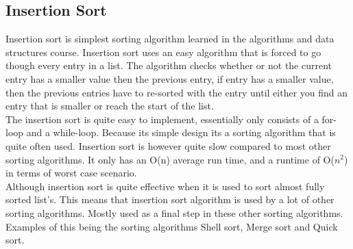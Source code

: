 \subsection{Insertion Sort}
Insertion sort is simplest sorting algorithm learned in the algorithms and data structures course. Insertion sort uses an easy algorithm that is forced to go though every entry in a list. The algorithm checks whether or not the current entry has a smaller value then the previous entry, if entry has a smaller value, then the previous entries have to re-sorted with the entry until either you find an entry that is smaller or reach the start of the list. 
\\[11pt]
The insertion sort is quite easy to implement, essentially only consists of a for-loop and a while-loop. Because its simple design its a sorting algorithm that is quite often used. Insertion sort is however quite slow compared to most other sorting algorithms. It only has an O(n) average run time, and a runtime of O($n^2$) in terms of worst case scenario.
\\[11pt]
Although insertion sort is quite effective when it is used to sort almost fully sorted list's. This means that insertion sort algorithm is used by a lot of other sorting algorithms. Mostly used as a final step in these other sorting algorithms. Examples of this being the sorting algorithms Shell sort, Merge sort and Quick sort.\cite{InsertionSort:Geeks,InsertionSort:StudyTonight}	%